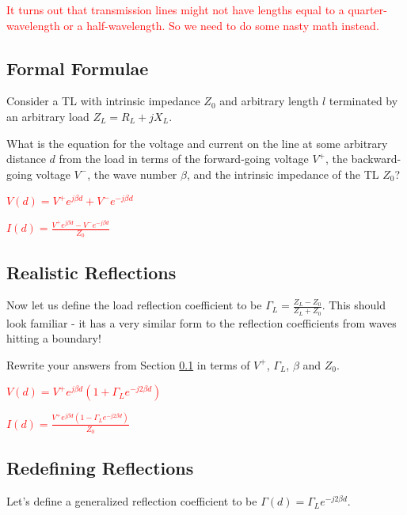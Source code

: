 \documentclass{article}
\begin{document}
\textcolor{red}{It turns out that transmission lines might not have lengths equal to a quarter-wavelength or a half-wavelength. So we need to do some nasty math instead.}

\vfill

\subsection{Formal Formulae}
\label{section:formal_formulae}

Consider a TL with intrinsic impedance $Z_0$ and arbitrary length $l$ terminated by an arbitrary load $Z_L = R_L + jX_L$.

What is the equation for the voltage and current on the line at some arbitrary distance $d$ from the load in terms of the forward-going voltage $V^+$, the backward-going voltage $V^-$, the wave number $\beta$, and the intrinsic impedance of the TL $Z_0$?

\textcolor{red}{$V(d) = V^+ e^{j\beta d} + V^- e^{-j \beta d}$}

\textcolor{red}{$I(d) = \frac{V^+ e^{j\beta d} - V^- e^{-j \beta d}}{Z_0}$}

\vfill

\subsection{Realistic Reflections}
\label{section:realistic_reflections}

Now let us define the load reflection coefficient to be $\Gamma_L = \frac{Z_L - Z_0}{Z_L + Z_0}$. This should look familiar - it has a very similar form to the reflection coefficients from waves hitting a boundary!

Rewrite your answers from Section \ref{section:formal_formulae} in terms of $V^+$, $\Gamma_L$, $\beta$ and $Z_0$.

\textcolor{red}{$V(d) = V^+ e^{j\beta d}(1 + \Gamma_L e^{-j2 \beta d})$}

\textcolor{red}{$I(d) = \frac{V^+ e^{j\beta d}(1 - \Gamma_L e^{-j2\beta d})}{Z_0}$}

\vfill

\subsection{Redefining Reflections}
\label{section:redefining_reflections}

Let's define a generalized reflection coefficient to be $\Gamma(d) = \Gamma_L e^{-j2 \beta d}$.
\end{document}
